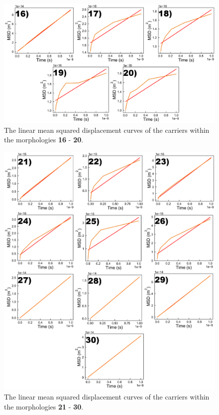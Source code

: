 \documentclass[12pt]{article}
\begin{document}
\begin{figure}[h!]\centering
	\includegraphics[width=\textwidth]{Figures/LinMSDHoleOrig.png}
    \caption{The linear mean squared displacement curves of the carriers within the morphologies \textbf{16} - \textbf{20}.}
	\label{fig:MSDOrig}
\end{figure}

\begin{figure}[h!]\centering
	\includegraphics[width=\textwidth]{Figures/LinMSDHoleFrameOrig.png}
    \caption{The linear mean squared displacement curves of the carriers within the morphologies \textbf{21} - \textbf{30}.}
	\label{fig:MSDFrameOrig}
\end{figure}
\end{document}
